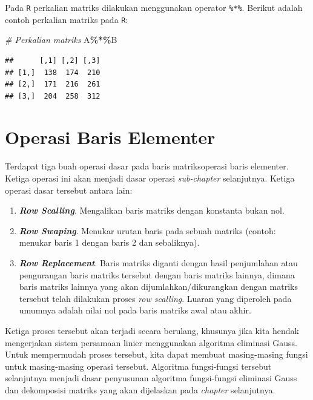 \documentclass[
]{book}
\newenvironment{Shaded}{\begin{snugshade}}{\end{snugshade}}
\newcommand{\CommentTok}[1]{\textcolor[rgb]{0.56,0.35,0.01}{\textit{#1}}}
\newcommand{\NormalTok}[1]{#1}
\newcommand{\SpecialCharTok}[1]{\textcolor[rgb]{0.81,0.36,0.00}{\textbf{#1}}}
\providecommand{\tightlist}{%
  \setlength{\itemsep}{0pt}\setlength{\parskip}{0pt}}
\theoremstyle{definition}
\theoremstyle{definition}
\theoremstyle{definition}
\theoremstyle{definition}
\theoremstyle{remark}
\begin{document}
Pada \texttt{R} perkalian matriks dilakukan menggunakan operator \texttt{\%*\%}. Berikut adalah contoh perkalian matriks pada \texttt{R}:

\begin{Shaded}
\begin{Highlighting}[]
\CommentTok{\# Perkalian matriks}
\NormalTok{A}\SpecialCharTok{\%*\%}\NormalTok{B}
\end{Highlighting}
\end{Shaded}

\begin{verbatim}
##      [,1] [,2] [,3]
## [1,]  138  174  210
## [2,]  171  216  261
## [3,]  204  258  312
\end{verbatim}

\hypertarget{rowoperation}{%
\section{Operasi Baris Elementer}\label{rowoperation}}

Terdapat tiga buah operasi dasar pada baris matriksoperasi baris elementer. Ketiga operasi ini akan menjadi dasar operasi \emph{sub-chapter} selanjutnya. Ketiga operasi dasar tersebut antara lain:

\begin{enumerate}
\def\labelenumi{\arabic{enumi}.}
\tightlist
\item
  \textbf{\emph{Row Scalling}}. Mengalikan baris matriks dengan konstanta bukan nol.
\item
  \textbf{\emph{Row Swaping}}. Menukar urutan baris pada sebuah matriks (contoh: menukar baris 1 dengan baris 2 dan sebaliknya).
\item
  \textbf{\emph{Row Replacement}}. Baris matriks diganti dengan hasil penjumlahan atau pengurangan baris matriks tersebut dengan baris matriks lainnya, dimana baris matriks lainnya yang akan dijumlahkan/dikurangkan dengan matriks tersebut telah dilakukan proses \emph{row scalling}. Luaran yang diperoleh pada umumnya adalah nilai nol pada baris matriks awal atau akhir.
\end{enumerate}

Ketiga proses tersebut akan terjadi secara berulang, khusunya jika kita hendak mengerjakan sistem persamaan linier menggunakan algoritma eliminasi Gauss. Untuk mempermudah proses tersebut, kita dapat membuat masing-masing fungsi untuk masing-masing operasi tersebut. Algoritma fungsi-fungsi tersebut selanjutnya menjadi dasar penyusunan algoritma fungsi-fungsi eliminasi Gauss dan dekomposisi matriks yang akan dijelaskan pada \emph{chapter} selanjutnya.
\end{document}
